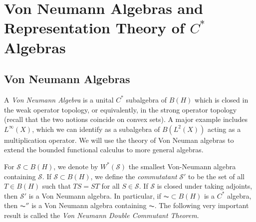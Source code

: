 \chapter{Von Neumann Algebras and Representation Theory of $C^*$ Algebras}







\section{Von Neumann Algebras}

A \emph{Von Neumann Algebra} is a unital $C^*$ subalgebra of $B(H)$ which is closed in the weak operator topology, or equivalently, in the strong operator topology (recall that the two notions coincide on convex sets). A major example includes $L^\infty(X)$, which we can identify as a subalgebra of $B(L^2(X))$ acting as a multiplication operator. We will use the theory of Von Neuman algebras to extend the bounded functional calculus to more general algebras.

For $\mathcal{S} \subset B(H)$, we denote by $W^*(\mathcal{S})$ the smallest Von-Neumann algebra containing $\mathcal{S}$. If $\mathcal{S} \subset B(H)$, we define the \emph{commutatant} $\mathcal{S}'$ to be the set of all $T \in B(H)$ such that $TS = ST$ for all $S \in \mathcal{S}$. If $\mathcal{S}$ is closed under taking adjoints, then $\mathcal{S}'$ is a Von Neumann algebra. In particular, if $\AC \subset B(H)$ is a $C^*$ algebra, then $\AC''$ is a Von Neumann algebra containing $\AC$. The following very important result is called the \emph{Von Neumann Double Commutant Theorem}.

